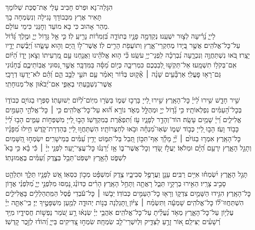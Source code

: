 \documentclass[twoside, openany, parskip=half, 11pt]{book}
\begin{document}
הִגָּלֵה־נָא וּפְרֹס חָבִיב עָלַי אֶת־סֻכַּת שְׁלוֹמָךְ\\
תָּאִיר אֶרֶץ מִכְּבוֹדָךְ נָגִילָה וְנִשְׂמְחָה בָךְ\\
מַהֵר אָהוּב כִּי בָא מוֹעֵד וְחׇנֵּנִי כִּימֵי עוֹלָם.\\

לַייָ֑ נָ֝רִ֗יעָה לְצ֣וּר יִשְׁעֵֽנוּ׃
נְקַדְּמָ֣ה פָנָ֣יו בְּתוֹדָ֑ה בִּ֝זְמִר֗וֹת נָרִ֥יעַֽ לֽוֹ׃
כִּ֤י אֵ֣ל גָּד֣וֹל יְיָ֑ וּמֶ֥לֶךְ גָּ֝ד֗וֹל עַל־כׇּל־אֱלֹהִֽים׃
אֲשֶׁ֣ר בְּ֭יָדוֹ מֶחְקְרֵי־אָ֑רֶץ וְתוֹעֲפֹ֖ת הָרִ֣ים לֽוֹ׃
אֲשֶׁר־ל֣וֹ הַ֭יָּם וְה֣וּא עָשָׂ֑הוּ וְ֝יַבֶּ֗שֶׁת יָדָ֥יו יָצָֽרוּ׃
בֹּ֭אוּ נִשְׁתַּחֲוֶ֣ה וְנִכְרָ֑עָה נִ֝בְרְכָ֗ה לִֽפְנֵי־יְיָ֥ עֹשֵֽׂנוּ׃
כִּ֘י ה֤וּא אֱלֹהֵ֗ינוּ וַאֲנַ֤חְנוּ עַ֣ם מַ֭רְעִיתוֹ וְצֹ֣אן יָד֑וֹ הַ֝יּ֗וֹם אִֽם־בְּקֹל֥וֹ תִשְׁמָֽעוּ׃
אַל־תַּקְשׁ֣וּ לְ֭בַבְכֶם כִּמְרִיבָ֑ה כְּי֥וֹם מַ֝סָּ֗ה בַּמִּדְבָּֽר׃
אֲשֶׁ֣ר נִ֭סּוּנִי אֲבֽוֹתֵיכֶ֑ם בְּ֝חָנ֗וּנִי גַּם־רָא֥וּ פׇעֳלִֽי׃
אַרְבָּ֘עִ֤ים שָׁנָ֨ה ׀ אָ֘ק֤וּט בְּד֗וֹר וָאֹמַ֗ר עַ֤ם תֹּעֵ֣י לֵבָ֣ב הֵ֑ם וְ֝הֵ֗ם לֹא־יָדְע֥וּ דְרָכָֽי׃
אֲשֶׁר־נִשְׁבַּ֥עְתִּי בְאַפִּ֑י אִם־יְ֝בֹא֗וּן אֶל־מְנוּחָתִֽי׃


שִׁ֣יר חָדָ֑שׁ שִׁ֥ירוּ לַ֝ייָ֗ כׇּל־הָאָֽרֶץ׃
שִׁ֣ירוּ לַ֭ייָ בָּרְכ֣וּ שְׁמ֑וֹ בַּשְּׂר֥וּ מִיּֽוֹם־לְ֝י֗וֹם יְשׁוּעָתֽוֹ׃
סַפְּר֣וּ בַגּוֹיִ֣ם כְּבוֹד֑וֹ בְּכׇל־הָ֝עַמִּ֗ים נִפְלְאוֹתָֽיו׃
כִּ֥י גָ֘ד֤וֹל יְיָ֣ וּמְהֻלָּ֣ל מְאֹ֑ד נוֹרָ֥א ה֗֝וּא עַל־כׇּל־אֱלֹהִֽים׃
כִּ֤י ׀ כׇּל־אֱלֹהֵ֣י הָעַמִּ֣ים אֱלִילִ֑ים וַ֝ייָ֗ שָׁמַ֥יִם עָשָֽׂה׃
הוֹד־וְהָדָ֥ר לְפָנָ֑יו עֹ֥ז וְ֝תִפְאֶ֗רֶת בְּמִקְדָּשֽׁוֹ׃
הָב֣וּ לַ֭ייָ מִשְׁפְּח֣וֹת עַמִּ֑ים הָב֥וּ לַ֝ייָ֗ כָּב֥וֹד וָעֹֽז׃
הָב֣וּ לַ֭ייָ כְּב֣וֹד שְׁמ֑וֹ שְׂאֽוּ־מִ֝נְחָ֗ה וּבֹ֥אוּ לְחַצְרוֹתָֽיו׃
הִשְׁתַּחֲו֣וּ לַ֭ייָ בְּהַדְרַת־קֹ֑דֶשׁ חִ֥ילוּ מִ֝פָּנָ֗יו כׇּל־הָאָֽרֶץ׃
אִמְר֤וּ בַגּוֹיִ֨ם ׀ יְ֘יָ֤ מָלָ֗ךְ אַף־תִּכּ֣וֹן תֵּ֭בֵל בַּל־תִּמּ֑וֹט יָדִ֥ין עַ֝מִּ֗ים בְּמֵישָׁרִֽים׃
יִשְׂמְח֣וּ הַ֭שָּׁמַיִם וְתָגֵ֣ל הָאָ֑רֶץ יִֽרְעַ֥ם הַ֝יָּ֗ם וּמְלֹאֽוֹ׃
יַעֲלֹ֣ז שָׂ֭דַי וְכׇל־אֲשֶׁר־בּ֑וֹ אָ֥ז יְ֝רַנְּנ֗וּ כׇּל־עֲצֵי־יָֽעַר׃
לִפְנֵ֤י יְיָ֨ ׀ כִּ֬י בָ֗א כִּ֥י בָא֮ לִשְׁפֹּ֢ט הָ֫אָ֥רֶץ יִשְׁפֹּֽט־תֵּבֵ֥ל בְּצֶ֑דֶק וְ֝עַמִּ֗ים בֶּאֱמוּנָתֽוֹ׃

תָּגֵ֣ל הָאָ֑רֶץ יִ֝שְׂמְח֗וּ אִיִּ֥ים רַבִּֽים׃
עָנָ֣ן וַעֲרָפֶ֣ל סְבִיבָ֑יו צֶ֥דֶק וּ֝מִשְׁפָּ֗ט מְכ֣וֹן כִּסְאֽוֹ׃
אֵ֭שׁ לְפָנָ֣יו תֵּלֵ֑ךְ וּתְלַהֵ֖ט סָבִ֣יב צָרָֽיו׃
הֵאִ֣ירוּ בְרָקָ֣יו תֵּבֵ֑ל רָאֲתָ֖ה וַתָּחֵ֣ל הָאָֽרֶץ׃
הָרִ֗ים כַּדּוֹנַ֗ג נָ֭מַסּוּ מִלִּפְנֵ֣י יְיָ֑ מִ֝לִּפְנֵ֗י אֲד֣וֹן כׇּל־הָאָֽרֶץ׃
הִגִּ֣ידוּ הַשָּׁמַ֣יִם צִדְק֑וֹ וְרָא֖וּ כׇל־הָעַמִּ֣ים כְּבוֹדֽוֹ׃
יֵבֹ֤שׁוּ ׀ כׇּל־עֹ֬בְדֵי פֶ֗סֶל הַמִּֽתְהַלְלִ֥ים בָּאֱלִילִ֑ים הִשְׁתַּחֲווּ־ל֗֝וֹ כׇּל־אֱלֹהִֽים׃
שָׁמְעָ֬ה וַתִּשְׂמַ֨ח ׀ צִיּ֗וֹן וַ֭תָּגֵלְנָה בְּנ֣וֹת יְהוּדָ֑ה לְמַ֖עַן מִשְׁפָּטֶ֣יךָ יְיָ׃
כִּֽי־אַתָּ֤ה יְיָ֗ עֶלְי֥וֹן עַל־כׇּל־הָאָ֑רֶץ מְאֹ֥ד נַ֝עֲלֵ֗יתָ עַל־כׇּל־אֱלֹהִֽים׃
אֹֽהֲבֵ֥י יְיָ֗ שִׂנְא֫וּ רָ֥ע שֹׁ֭מֵר נַפְשׁ֣וֹת חֲסִידָ֑יו מִיַּ֥ד רְ֝שָׁעִ֗ים יַצִּילֵֽם׃
א֭וֹר זָרֻ֣עַ לַצַּדִּ֑יק וּֽלְיִשְׁרֵי־לֵ֥ב שִׂמְחָֽה׃
שִׂמְח֣וּ צַ֭דִּיקִים בַּייָ֑ וְ֝הוֹד֗וּ לְזֵ֣כֶר קׇדְשֽׁוֹ׃
\end{document}
